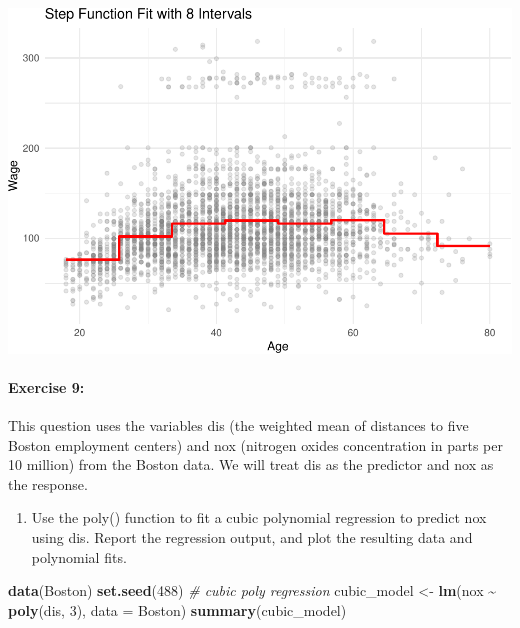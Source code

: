 \documentclass[
]{article}
\newenvironment{Shaded}{\begin{snugshade}}{\end{snugshade}}
\newcommand{\AttributeTok}[1]{\textcolor[rgb]{0.13,0.29,0.53}{#1}}
\newcommand{\CommentTok}[1]{\textcolor[rgb]{0.56,0.35,0.01}{\textit{#1}}}
\newcommand{\DecValTok}[1]{\textcolor[rgb]{0.00,0.00,0.81}{#1}}
\newcommand{\FunctionTok}[1]{\textcolor[rgb]{0.13,0.29,0.53}{\textbf{#1}}}
\newcommand{\NormalTok}[1]{#1}
\newcommand{\OtherTok}[1]{\textcolor[rgb]{0.56,0.35,0.01}{#1}}
\newcommand{\SpecialCharTok}[1]{\textcolor[rgb]{0.81,0.36,0.00}{\textbf{#1}}}
\providecommand{\tightlist}{%
  \setlength{\itemsep}{0pt}\setlength{\parskip}{0pt}}
\begin{document}
\includegraphics{chapter-07-hw_files/figure-latex/unnamed-chunk-3-1.pdf}

\paragraph{Exercise 9:}\label{exercise-9}

This question uses the variables dis (the weighted mean of distances to
five Boston employment centers) and nox (nitrogen oxides concentration
in parts per 10 million) from the Boston data. We will treat dis as the
predictor and nox as the response.

\begin{enumerate}
\def\labelenumi{(\alph{enumi})}
\tightlist
\item
  Use the poly() function to fit a cubic polynomial regression to
  predict nox using dis. Report the regression output, and plot the
  resulting data and polynomial fits.
\end{enumerate}

\begin{Shaded}
\begin{Highlighting}[]
\FunctionTok{data}\NormalTok{(Boston)}
\FunctionTok{set.seed}\NormalTok{(}\DecValTok{488}\NormalTok{)}
\CommentTok{\# cubic poly regression}
\NormalTok{cubic\_model }\OtherTok{\textless{}{-}} \FunctionTok{lm}\NormalTok{(nox }\SpecialCharTok{\textasciitilde{}} \FunctionTok{poly}\NormalTok{(dis, }\DecValTok{3}\NormalTok{), }\AttributeTok{data =}\NormalTok{ Boston)}
\FunctionTok{summary}\NormalTok{(cubic\_model)}
\end{Highlighting}
\end{Shaded}
\end{document}
